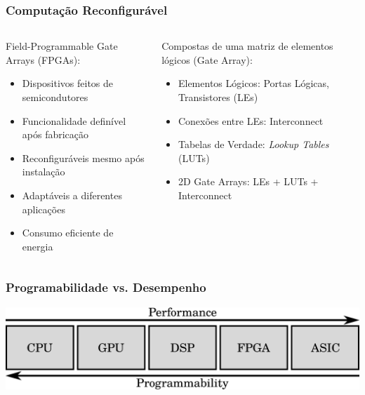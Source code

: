 \documentclass[10pt, compress, aspectratio=169, xcolor={table,usenames,dvipsnames}]{beamer}
\begin{document}
\begin{frame}
    \frametitle{Computação Reconfigurável}
    \begin{columns}
      \begin{column}{0.45\columnwidth}
        \alert{Field-Programmable} Gate Arrays (FPGAs):

        \begin{itemize}
        \item Dispositivos feitos de semicondutores
        \item Funcionalidade definível após fabricação
        \item \alert{Reconfiguráveis} mesmo após instalação
        \item Adaptáveis a diferentes aplicações
        \item \alert{Consumo eficiente de energia}
        \end{itemize}
      \end{column}

      \begin{column}{0.55\columnwidth}
        Compostas de uma matriz de elementos lógicos (\alert{Gate Array}):

        \begin{itemize}
        \item Elementos Lógicos: Portas Lógicas, Transistores (\alert{LEs})
        \item Conexões entre LEs: \alert{Interconnect}
        \item Tabelas de Verdade: \textit{Lookup Tables} (\alert{LUTs})
        \item 2D Gate Arrays: \alert{LEs} + \alert{LUTs} + \alert{Interconnect}
        \end{itemize}
      \end{column}
    \end{columns}
\end{frame}

\begin{frame}
    \frametitle{Programabilidade vs. Desempenho}
    \begin{center}
        \includegraphics[width=.7\textwidth]{fpga-tradeoff}
    \end{center}
\end{frame}
\end{document}

